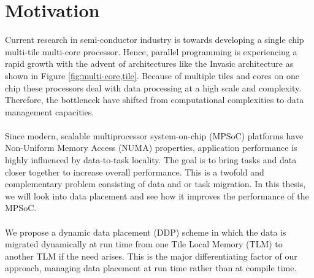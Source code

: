 \documentclass{listhesis}
\begin{document}
\section{Motivation}
Current research in semi-conductor industry is towards developing a single chip multi-tile multi-core processor. Hence, parallel programming is experiencing a rapid growth with the advent of architectures like the Invasic architecture as shown in Figure \ref{fig:multi-core,tile}. Because of multiple tiles and cores on one chip these processors deal with data processing at a high scale and complexity. Therefore, the bottleneck have shifted from computational complexities to data management capacities.\\
\\
Since modern, scalable multiprocessor system-on-chip (MPSoC) platforms have Non-Uniform Memory Access (NUMA) properties, application performance is highly influenced by data-to-task locality. The goal is to bring tasks and data closer together to increase overall performance. This is a twofold and complementary problem consisting of data and or task migration. In this thesis, we will look into data placement and see how it improves the performance of the MPSoC.\\
\\
We propose a dynamic data placement (DDP) scheme in which the data is migrated dynamically at run time from one Tile Local Memory (TLM) to another TLM if the need arises. This is the major differentiating factor of our approach, managing data placement at run time rather than at compile time.
\end{document}
